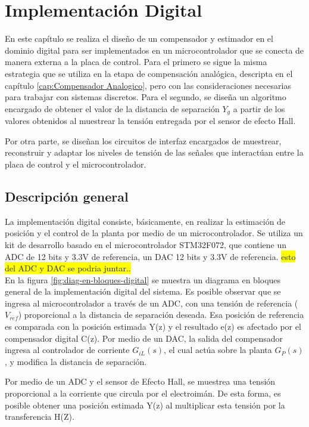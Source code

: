 \chapter{Implementación Digital}  \label{cap:Implementacion digital}

En este capítulo se realiza el diseño de un compensador y estimador en el dominio digital para ser implementados en un microcontrolador que se conecta de manera externa a la placa de control. Para el primero se sigue la misma estrategia que se utiliza en la etapa de compensación analógica, descripta en el capítulo \ref{cap:Compensador Analogico}, pero con las consideraciones necesarias para trabajar con sistemas discretos. Para el segundo, se diseña un algoritmo encargado de obtener el valor de la distancia de separación $Y_g$ a partir de los valores obtenidos al muestrear la tensión entregada por el sensor de efecto Hall.

Por otra parte, se diseñan los circuitos de interfaz encargados de muestrear, reconstruir y adaptar los niveles de tensión de las señales que interactúan entre la placa de control y el microcontrolador.


\section{Descripción general}

\noindent La implementación digital consiste, básicamente, en realizar la estimación de posición y el control de la planta por medio de un microcontrolador. Se utiliza un kit de desarrollo basado en el microcontrolador STM32F072, que contiene un ADC de 12 bits y 3.3V de referencia, un DAC 12 bits y 3.3V de referencia. \colorbox{yellow}{esto del ADC y DAC se podria juntar..}\\

\noindent En la figura \ref{fig:diag-en-bloques-digital} se muestra un diagrama en bloques general de la implementación digital del sistema. Es posible observar que se ingresa al microcontrolador a través de un ADC, con una tensión de referencia ($V_{ref}$) proporcional a la distancia de separación deseada. Esa posición de referencia es comparada con la posición estimada Y(z) y el resultado e(z) es afectado por el compensador digital C(z). Por medio de un DAC, la salida del compensador ingresa al controlador de corriente $G_{iL}(s)$, el cual actúa sobre la planta $G_P(s)$, y modifica la distancia de separación.

\noindent Por medio de un ADC y el sensor de Efecto Hall, se muestrea una tensión proporcional a la corriente que circula por el electroimán. De esta forma, es posible obtener una posición estimada Y(z) al multiplicar esta tensión por la transferencia H(Z).


